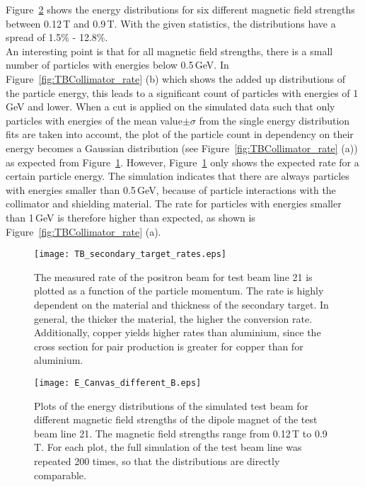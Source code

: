 Figure~\ref{fig:E_different_B} shows the energy distributions for six different 
magnetic field strengths between 0.12\,T and 0.9\,T. With the given statistics, 
the distributions have a spread of 1.5\% - 12.8\%.\\An interesting point is that 
for all magnetic field strengths, there is a small number of particles with 
energies below 0.5\,GeV. In Figure~\ref{fig:TBCollimator_rate} (b) which shows 
the added up distributions of the particle energy, this leads to a significant 
count of particles with energies of 1\,GeV and lower. When a cut is applied on 
the simulated data such that only particles with energies of the mean value$\pm 
\sigma$ from the single energy distribution fits are taken into account, the 
plot of the particle count in dependency on their energy becomes a Gaussian 
distribution (see Figure~\ref{fig:TBCollimator_rate} (a)) as expected from 
Figure~\ref{fig:TB_secondary_target_rates}. However, 
Figure~\ref{fig:TB_secondary_target_rates} only shows the expected rate for a 
certain particle energy. The simulation indicates that there are always 
particles with energies smaller than 0.5\,GeV, because of particle interactions 
with the collimator and shielding material. The rate for particles with energies 
smaller than 1\,GeV is therefore higher than expected, as shown is 
Figure~\ref{fig:TBCollimator_rate} (a). 

\begin{figure}[ht]
  \centering
  \texttt{[image: TB\_secondary\_target\_rates.eps]}
  \caption[Test beam rate dependency on properties of secondary target.]{The measured rate of the positron beam for test beam line 21 is plotted as a function of the particle momentum. The rate is highly dependent on the material and thickness of the secondary target. In general, the thicker the material, the higher the conversion rate. Additionally, copper yields higher rates than aluminium, since the cross section for pair production is greater for copper than for aluminium.}
    \label{fig:TB_secondary_target_rates}
\end{figure}

\begin{figure}[H]
  \centering
  \texttt{[image: E\_Canvas\_different\_B.eps]}
  \caption[Plot of the simulated energy distributions for different magnetic field strengths.]{Plots of the energy distributions of the simulated test beam for different magnetic field strengths of the dipole magnet of the test beam line 21. The magnetic field strengths range from 0.12\,T to 0.9\,T. For each plot, the full simulation of the test beam line was repeated 200 times, so that the distributions are directly comparable.}
    \label{fig:E_different_B}
\end{figure}

